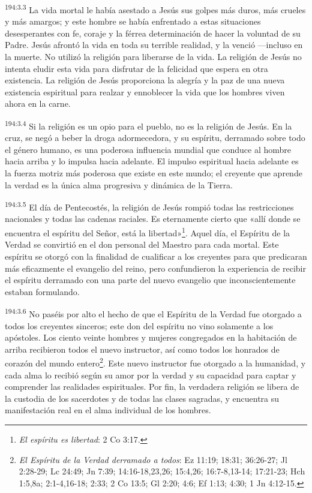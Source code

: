 \par 
\textsuperscript{194:3.3} La vida mortal le había asestado a Jesús sus golpes más duros, más crueles y más amargos; y este hombre se había enfrentado a estas situaciones desesperantes con fe, coraje y la férrea determinación de hacer la voluntad de su Padre. Jesús afrontó la vida en toda su terrible realidad, y la venció ---incluso en la muerte. No utilizó la religión para liberarse de la vida. La religión de Jesús no intenta eludir esta vida para disfrutar de la felicidad que espera en otra existencia. La religión de Jesús proporciona la alegría y la paz de una nueva existencia espiritual para realzar y ennoblecer la vida que los hombres viven ahora en la carne.

\par 
\textsuperscript{194:3.4} Si la religión es un opio para el pueblo, no es la religión de Jesús. En la cruz, se negó a beber la droga adormecedora, y su espíritu, derramado sobre todo el género humano, es una poderosa influencia mundial que conduce al hombre hacia arriba y lo impulsa hacia adelante. El impulso espiritual hacia adelante es la fuerza motriz más poderosa que existe en este mundo; el creyente que aprende la verdad es la única alma progresiva y dinámica de la Tierra.

\par 
\textsuperscript{194:3.5} El día de Pentecostés, la religión de Jesús rompió todas las restricciones nacionales y todas las cadenas raciales. Es eternamente cierto que «allí donde se encuentra el espíritu del Señor, está la libertad»\footnote{\textit{El espíritu es libertad}: 2 Co 3:17.}. Aquel día, el Espíritu de la Verdad se convirtió en el don personal del Maestro para cada mortal. Este espíritu se otorgó con la finalidad de cualificar a los creyentes para que predicaran más eficazmente el evangelio del reino, pero confundieron la experiencia de recibir el espíritu derramado con una parte del nuevo evangelio que inconscientemente estaban formulando.

\par 
\textsuperscript{194:3.6} No paséis por alto el hecho de que el Espíritu de la Verdad fue otorgado a todos los creyentes sinceros; este don del espíritu no vino solamente a los apóstoles. Los ciento veinte hombres y mujeres congregados en la habitación de arriba recibieron todos el nuevo instructor, así como todos los honrados de corazón del mundo entero\footnote{\textit{El Espíritu de la Verdad derramado a todos}: Ez 11:19; 18:31; 36:26-27; Jl 2:28-29; Lc 24:49; Jn 7:39; 14:16-18,23,26; 15:4,26; 16:7-8,13-14; 17:21-23; Hch 1:5,8a; 2:1-4,16-18; 2:33; 2 Co 13:5; Gl 2:20; 4:6; Ef 1:13; 4:30; 1 Jn 4:12-15.}. Este nuevo instructor fue otorgado a la humanidad, y cada alma lo recibió según su amor por la verdad y su capacidad para captar y comprender las realidades espirituales. Por fin, la verdadera religión se libera de la custodia de los sacerdotes y de todas las clases sagradas, y encuentra su manifestación real en el alma individual de los hombres.

